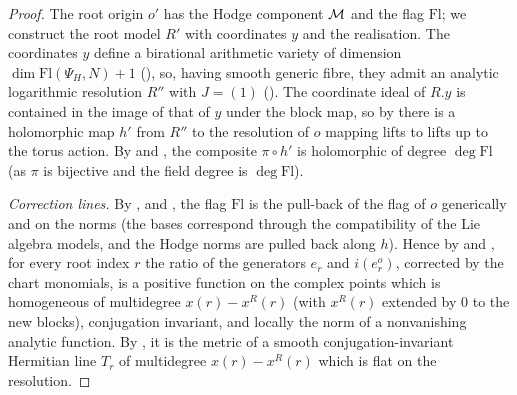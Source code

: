\begin{proof}
The root origin $o'$ has the Hodge component $\mathcal M$ and the flag $\mathrm{Fl}$; we construct the root model
$R'$ with coordinates $y$ and the realisation. The coordinates $y$ define a birational arithmetic variety of
dimension $\dim\mathrm{Fl}(\Psi_H,N)+1$ (), so, having
smooth generic fibre, they admit an analytic logarithmic resolution $R''$ with $J=(1)$
(). The coordinate ideal of $R.y$ is contained in the image
of that of $y$ under the block map, so by  there is
a holomorphic map $h'$ from $R''$ to the resolution of $o$ mapping lifts to lifts up to the torus action. By
 and , the
composite $\pi\circ h'$ is holomorphic of degree $\deg\mathrm{Fl}$ (as $\pi$ is bijective and the field degree is
$\deg\mathrm{Fl}$).

\emph{Correction lines.} By ,
 and , the flag
$\mathrm{Fl}$ is the pull-back of the flag of $o$ generically and on the norms (the bases correspond through the
compatibility of the Lie algebra models, and the Hodge norms are pulled back along $h$). Hence by
 and , for every
root index $r$ the ratio of the generators $e_r$ and $i(e^o_r)$, corrected by the chart monomials, is a positive
function on the complex points which is homogeneous of multidegree $x(r)-x^R(r)$ (with $x^R(r)$ extended by $0$ to
the new blocks), conjugation invariant, and locally the norm of a nonvanishing analytic function. By
, it is the metric of a smooth conjugation-invariant
Hermitian line $T_r$ of multidegree $x(r)-x^R(r)$ which is flat on the resolution.


\end{proof}

